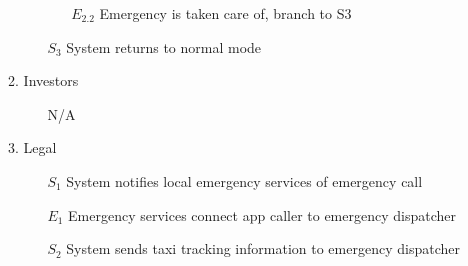 \documentclass[]{article}
\begin{document}
\begin{enumerate}[{\textbf{BE}}1.]
\begin{enumerate}[{VP6}.1]
\begin{enumerate}
\begin{enumerate}
                    \item[$E_{2.2}$] Emergency is taken care of, branch to S3
                \end{enumerate}
                \item[$S_3$] System returns to normal mode
            \end{enumerate}
        \item Investors
            \begin{enumerate}
                \item[N/A]
            \end{enumerate}
        \item Legal
            \begin{enumerate}
                \item[$S_1$] System notifies local emergency services of emergency call
                \item[$E_1$] Emergency services connect app caller to emergency dispatcher
                \item[$S_2$] System sends taxi tracking information to emergency dispatcher


\end{enumerate}
\end{enumerate}
\end{enumerate}
\end{document}
